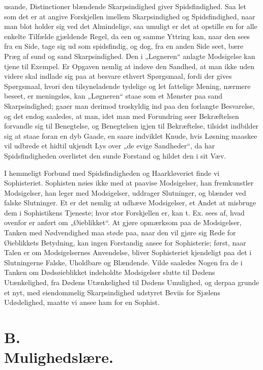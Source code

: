 \documentclass[12pt,a4paper]{book}
\begin{document}
usande, Distinctioner blændende Skarpsindighed giver Spidsfindighed.
Saa let som det er at angive Forskjellen imellem Skarpsindighed og
Spidsfindighed, naar man blot holder sig ved det Almindelige, saa
umuligt er det at opstille en for alle enkelte Tilfælde gjældende
Regel, da een og samme Yttring kan, naar den sees fra en Side, tage
sig ud som spidsfindig, og dog, fra en anden Side seet, bære Præg af
sund og sand Skarpsindighed. Den i „Løgneren“ anlagte Modsigelse kan
tjene til Exempel. Er Opgaven nemlig at indøve den Sandhed, at man
ikke uden videre skal indlade sig paa at besvare ethvert Spørgsmaal,
fordi der gives Spørgsmaal, hvori den tilsyneladende tydelige og let
fattelige Mening, nærmere beseet, er meningsløs, kan „Løgneren“ staae
som et Mønster paa sand Skarpsindighed; gaaer man derimod troskyldig
ind paa den forlangte Besvarelse, og det endog saaledes, at man, idet
man med Forundring seer Bekræftelsen forvandle sig til Benegtelse, og
Benegtelsen igjen til Bekræftelse, tilsidst indbilder sig at staae
foran en dyb Gaade, en saare indviklet Knude, hvis Løsning maaskee vil
udbrede et hidtil ukjendt Lys over „de evige Sandheder“, da har
Spidsfindigheden overlistet den sunde Forstand og hildet den i sit
Væv.

I hemmeligt Forbund med Spidsfindigheden og Haarkløveriet finde vi
Sophisteriet. Sophisten nøies ikke med at paavise Modsigelser, han
fremkunstler Modsigelser, han leger med Modsigelser, uddrager
Slutninger, og blænder ved falske Slutninger. Et er det nemlig at
udhæve Modsigelser, et Andet at misbruge dem i Sophistikens Tjeneste;
hvor stor Forskjellen er, kan t. Ex. sees af, hvad ovenfor er anført
om „Øieblikket“. At gjøre opmærksom paa de Modsigelser, Tanken med
Nødvendighed maa støde paa, naar den vil gjøre sig Rede for
Øieblikkets Betydning, kan ingen Forstandig ansee
for Sophisterie; først, naar Talen er om Modsigelsernes Anvendelse,
bliver Sophisteriet kjendeligt paa det i Slutningerne Falske,
Uholdbare og Blændende. Vilde saaledes Nogen fra de i Tanken om
Dødsøieblikket indeholdte Modsigelser slutte til Dødens Utænkelighed,
fra Dødens Utænkelighed til Dødens Umulighed, og derpaa grunde et nyt,
med eiendommelig Skarpsindighed udstyret Beviis for Sjælens
Udødelighed, maatte vi ansee ham for en Sophist.

\section*{B.\\ Mulighedslære.}
\end{document}
